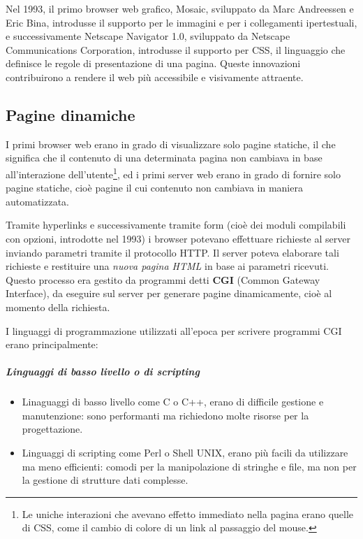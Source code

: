 Nel 1993, il primo browser web grafico, Mosaic, sviluppato da Marc
Andreessen e Eric Bina, introdusse il supporto per le immagini e per i
collegamenti ipertestuali, e successivamente Netscape Navigator 1.0,
sviluppato da Netscape Communications Corporation, introdusse il
supporto per CSS, il linguaggio che definisce le regole di presentazione
di una pagina. Queste innovazioni contribuirono a rendere il web più
accessibile e visivamente attraente.

\subsection{Pagine dinamiche}\label{pagine-dinamiche}

I primi browser web erano in grado di visualizzare solo pagine statiche,
il che significa che il contenuto di una determinata pagina non cambiava
in base all'interazione dell'utente\footnote{Le uniche interazioni che
  avevano effetto immediato nella pagina erano quelle di CSS, come il
  cambio di colore di un link al passaggio del mouse.}, ed i primi
server web erano in grado di fornire solo pagine statiche, cioè pagine
il cui contenuto non cambiava in maniera automatizzata.

Tramite hyperlinks e successivamente tramite form (cioè dei moduli
compilabili con opzioni, introdotte nel 1993) i browser potevano
effettuare richieste al server inviando parametri tramite il protocollo
HTTP. Il server poteva elaborare tali richieste e restituire una
\emph{nuova pagina HTML} in base ai parametri ricevuti. Questo processo
era gestito da programmi detti \textbf{CGI} (Common Gateway Interface),
da eseguire sul server per generare pagine dinamicamente, cioè al
momento della richiesta.

I linguaggi di programmazione utilizzati all'epoca per scrivere
programmi CGI erano principalmente:

\subparagraph{Linguaggi di basso livello o di
scripting}\label{linguaggi-di-basso-livello-o-di-scripting}

\begin{itemize}
\item
  Linaguaggi di basso livello come C o C++, erano di difficile gestione
  e manutenzione: sono performanti ma richiedono molte risorse per la
  progettazione.
\item
  Linguaggi di scripting come Perl o Shell UNIX, erano più facili da
  utilizzare ma meno efficienti: comodi per la manipolazione di stringhe
  e file, ma non per la gestione di strutture dati complesse.
\end{itemize}

